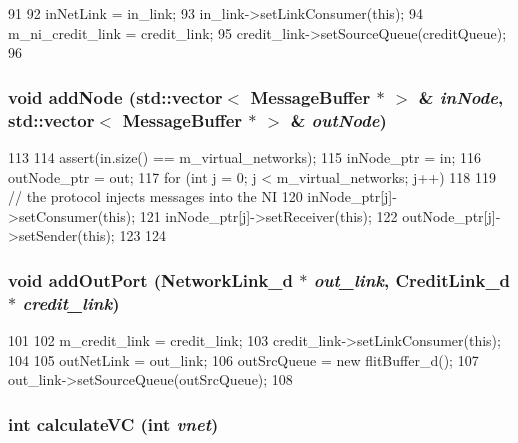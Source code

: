 \begin{DoxyCode}
91 {
92     inNetLink = in_link;
93     in_link->setLinkConsumer(this);
94     m_ni_credit_link = credit_link;
95     credit_link->setSourceQueue(creditQueue);
96 }
\end{DoxyCode}
\hypertarget{classNetworkInterface__d_abb78e667f7f184a1989354ba522d32a9}{
\subsubsection[{addNode}]{\setlength{\rightskip}{0pt plus 5cm}void addNode ({\bf std::vector}$<$ {\bf MessageBuffer} $\ast$ $>$ \& {\em inNode}, \/  {\bf std::vector}$<$ {\bf MessageBuffer} $\ast$ $>$ \& {\em outNode})}}
\label{classNetworkInterface__d_abb78e667f7f184a1989354ba522d32a9}



\begin{DoxyCode}
113 {
114     assert(in.size() == m_virtual_networks);
115     inNode_ptr = in;
116     outNode_ptr = out;
117     for (int j = 0; j < m_virtual_networks; j++) {
118 
119         // the protocol injects messages into the NI
120         inNode_ptr[j]->setConsumer(this);
121         inNode_ptr[j]->setReceiver(this);
122         outNode_ptr[j]->setSender(this);
123     }
124 }
\end{DoxyCode}
\hypertarget{classNetworkInterface__d_a8bb6c70f88a9da2c9adab0d72a2e6e3f}{
\subsubsection[{addOutPort}]{\setlength{\rightskip}{0pt plus 5cm}void addOutPort ({\bf NetworkLink\_\-d} $\ast$ {\em out\_\-link}, \/  {\bf CreditLink\_\-d} $\ast$ {\em credit\_\-link})}}
\label{classNetworkInterface__d_a8bb6c70f88a9da2c9adab0d72a2e6e3f}



\begin{DoxyCode}
101 {
102     m_credit_link = credit_link;
103     credit_link->setLinkConsumer(this);
104 
105     outNetLink = out_link;
106     outSrcQueue = new flitBuffer_d();
107     out_link->setSourceQueue(outSrcQueue);
108 }
\end{DoxyCode}
\hypertarget{classNetworkInterface__d_ab27658cc3136de94d2d08c78ac499aff}{
\subsubsection[{calculateVC}]{\setlength{\rightskip}{0pt plus 5cm}int calculateVC (int {\em vnet})}}
\label{classNetworkInterface__d_ab27658cc3136de94d2d08c78ac499aff}



